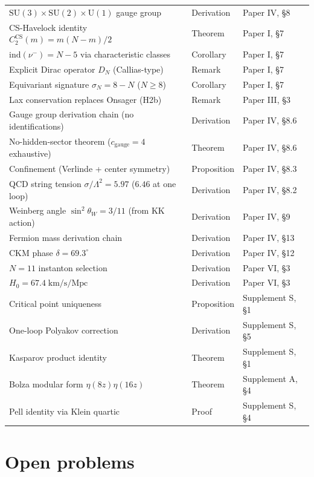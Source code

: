 \begin{table}[ht]
\begin{tabular}{@{}lll@{}}
$\mathrm{SU}(3)\times\mathrm{SU}(2)\times\mathrm{U}(1)$ gauge group & Derivation & Paper IV, \S 8 \\
CS-Havelock identity $C_2^{\mathrm{CS}}(m) = m(N{-}m)/2$ & Theorem & Paper I, \S 7 \\
$\mathrm{ind}(\nu^-) = N{-}5$ via characteristic classes & Corollary & Paper I, \S 7 \\
Explicit Dirac operator $D_N$ (Callias-type) & Remark & Paper I, \S 7 \\
Equivariant signature $\sigma_N = 8{-}N$ ($N \ge 8$) & Corollary & Paper I, \S 7 \\
Lax conservation replaces Onsager (H2b) & Remark & Paper III, \S 3 \\
Gauge group derivation chain (no identifications) & Derivation & Paper IV, \S 8.6 \\
No-hidden-sector theorem ($c_{\mathrm{gauge}} = 4$ exhaustive) & Theorem & Paper IV, \S 8.6 \\
Confinement (Verlinde + center symmetry) & Proposition & Paper IV, \S 8.3 \\
QCD string tension $\sigma/\Lambda^2 = 5.97$ ($6.46$ at one loop) & Derivation & Paper IV, \S 8.2 \\
Weinberg angle $\sin^2\theta_W = 3/11$ (from KK action) & Derivation & Paper IV, \S 9 \\
Fermion mass derivation chain & Derivation & Paper IV, \S 13 \\
CKM phase $\delta = 69.3^\circ$ & Derivation & Paper IV, \S 12 \\
$N=11$ instanton selection & Derivation & Paper VI, \S 3 \\
$H_0 = 67.4\;\mathrm{km/s/Mpc}$ & Derivation & Paper VI, \S 3 \\
Critical point uniqueness & Proposition & Supplement S, \S 1 \\
One-loop Polyakov correction & Derivation & Supplement S, \S 5 \\
Kasparov product identity & Theorem & Supplement S, \S 1 \\
Bolza modular form $\eta(8z)\eta(16z)$ & Theorem & Supplement A, \S 4 \\
Pell identity via Klein quartic & Proof & Supplement S, \S 4 \\
\bottomrule
\end{tabular}
\end{table}


\section{Open problems}
\label{app:open-problems}

